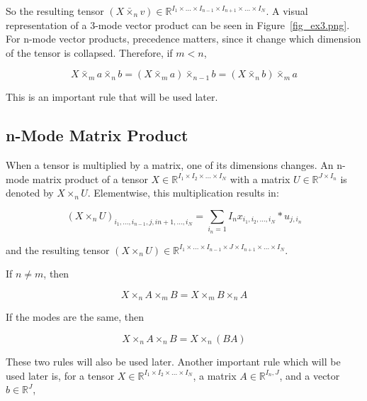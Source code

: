 \documentclass[twocolumn,10pt]{asme2ej}
\begin{document}
So the resulting tensor $(X \bar{\times}_n v ) \in \mathbb{R}^{I_1 \times ... \times I_{n-1} \times I_{n+1} \times ... \times I_N}$. A visual representation of a 3-mode vector product can be seen in Figure~\ref{fig_ex3.png}.
For n-mode vector products, precedence matters, since it change which dimension of the tensor is collapsed. Therefore, if $m < n$,

\begin{equation}
X \bar{\times}_m a \bar{\times}_n b = (X \bar{\times}_m a) \bar{\times}_{n-1} b = (X \bar{\times}_n b) \bar{\times}_m a
\label{eq_vectorMode}
\end{equation}

This is an important rule that will be used later.

\subsection{n-Mode Matrix Product}
When a tensor is multiplied by a matrix, one of its dimensions changes. An n-mode matrix product of a tensor $X \in \mathbb{R}^{I_1 \times I_2 \times ... \times I_N}$ with a matrix $U \in \mathbb{R}^{J \times I_n}$ is denoted by $X \times_n U$. Elementwise, this multiplication results in:

\begin{equation}
(X \times_n U )_{i_1, ..., i_{n-1}, j, i{n+1}, ..., i_N} = \sum_{i_n = 1}{I_n} x_{i_1, i_2, ..., i_N}*u_{j,i_n}
\end{equation}

and the resulting tensor $(X \times_n U ) \in \mathbb{R}^{I_1 \times ... \times I_{n-1} \times J \times I_{n+1} \times ... \times I_N}$.

If $n \neq m$, then

\begin{equation}
X \times_n A \times_m  B = X \times_m B \times_n A
\label{eq_matrixModeCommute}
\end{equation}

If the modes are the same, then

\begin{equation}
X \times_n A \times_n  B = X \times_n (BA)
\label{eq_matrixModeAssociate}
\end{equation}

These two rules will also be used later. Another important rule which will be used later is, for  a tensor $X \in \mathbb{R}^{I_1 \times I_2 \times ... \times I_N}$, a matrix $A \in \mathbb{R}^{I_n, J}$, and a vector $b \in \mathbb{R}^{J}$,
\end{document}
